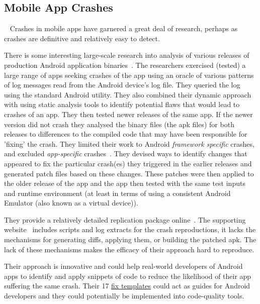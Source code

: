 \afterpage{\clearpage}

\subsection{Mobile App Crashes}~\label{rw-mobile-app-crashes-topic}
Crashes in mobile apps have garnered a great deal of research, perhaps as crashes are definitive and relatively easy to detect.

There is some interesting large-scale research into analysis of various releases of production Android application binaries~. The researchers exercised (tested) a large range of apps seeking crashes of the app using an oracle of various patterns of log messages read from the Android device's log file. They queried the log using the standard Android  utility. They also combined their dynamic approach with using static analysis tools to identify potential flaws that would lead to crashes of an app. They then tested newer releases of the same app. If the newer version did not crash they analysed the binary files (the \Gls{apk} 
files) for both releases to differences to the compiled code that may have been responsible for 'fixing' the crash. They limited their work to Android \emph{framework specific} crashes, and excluded \emph{app-specific} crashes~. They devised ways to identify changes that appeared to fix the particular crash(es) they triggered in the earlier releases and generated patch files based on these changes. These patches were then applied to the older release of the app and the app then tested with the same test inputs and runtime environment (at least in terms of using a consistent Android Emulator (also known as a virtual device)). 

They provide a relatively detailed replication package online~. The supporting website~ includes scripts and log extracts for the crash reproductions, it lacks the mechanisms for generating diffs, applying them, or building the patched \Gls{apk}. The lack of these mechanisms makes the efficacy of their approach hard to reproduce.

Their approach is innovative and could help real-world developers of Android apps to identify and apply snippets of code to reduce the likelihood of their app suffering the same crash. Their 17 \href{https://github.com/CraftDroid/ExpData/tree/master/Fix_Templates}{fix templates} could act as guides for Android developers and they could potentially be implemented into code-quality tools.
    
